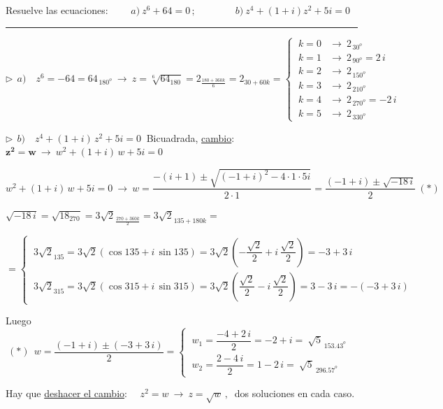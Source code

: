 \begin{miejercicio}

Resuelve las ecuaciones: $\qquad a)\ z^6+64=0\, ; \qquad \qquad b)\ z^4+(1+i)z^2+5i=0$ 

\rule{250pt}{0.5pt}

\vspace{6mm} $\triangleright \ \ a)\quad z^6=-64=64_{\, 180^o} \ \to \ z=\sqrt[6]{64_{180}}=2_{\frac{180+360k}{6}}=2_{30+60k}=
\begin{cases}
\ k=0 &\to \ 2_{\, 30^o} \\
\ k=1 &\to \ 2_{\, 90^o}=2\, i \\	
\ k=2 &\to \ 2_{\, 150^o} \\
\ k=3 &\to \ 2_{\, 210^o} \\
\ k=4 &\to \ 2_{\, 270^o}=-2\, i \\
\ k=5 &\to \ 2_{\, 330^o} 
\end{cases}$

\vspace{10mm} $\triangleright \ \ b)\quad z^4+(1+i)\, z^2+5i=0\ $ Bicuadrada, \underline{cambio}: $\boldsymbol{z^2=w} \ \to \ w^2+(1+i)\, w+5i=0$

\vspace{2mm} $w^2+(1+i)\, w+5i=0 \ \to \ w=\dfrac{-(i+1)\pm \sqrt{(-1+i)^2-4\cdot 1\cdot 5i}}{2\cdot 1}=\dfrac{(-1+i)\pm \sqrt{-18\, i}}{2} \ (*)$

\vspace{2mm} $\sqrt{-18\, i}=\sqrt{18_{270}}=3\sqrt{2}_{\frac{270+360k}{2}}=3\sqrt{2}_{135+180k}=$

\vspace{2mm} $=\begin{cases}
\ 3\sqrt{2}_{135}=3\sqrt{2} (\cos 135+i\, \sin 135)=3\sqrt{2} \left( -\dfrac{\sqrt{2}}{2} +i\, \dfrac{\sqrt{2}}{2} \right)=-3+3\, i	
\\
\ 3\sqrt{2}_{315}=3\sqrt{2} (\cos 315+i\, \sin 315)=3\sqrt{2} \left( \dfrac{\sqrt{2}}{2} -i\, \dfrac{\sqrt{2}}{2} \right)=3-3\, i=-(-3+3\, i)	
\end{cases}$

\vspace{2mm} Luego $\ (*) \ \ w=\dfrac{(-1+i)\pm (-3+3\, i)}{2} = \begin{cases}
 \ w_1=\dfrac{-4+2\, i}{2}=-2+i = \ \sqrt {5}_{\,153.43^o}\\
 \ w_2=\dfrac{2-4\, i}{2}=1-2\, i =\ \sqrt{5}_{\ 296.57^o}	
 \end{cases}$


\vspace{2mm} Hay que \underline{deshacer el cambio}: $\quad z^2=w \ \to \ z=\sqrt{w}\,, \ $ dos soluciones en cada caso.


\end{miejercicio}
